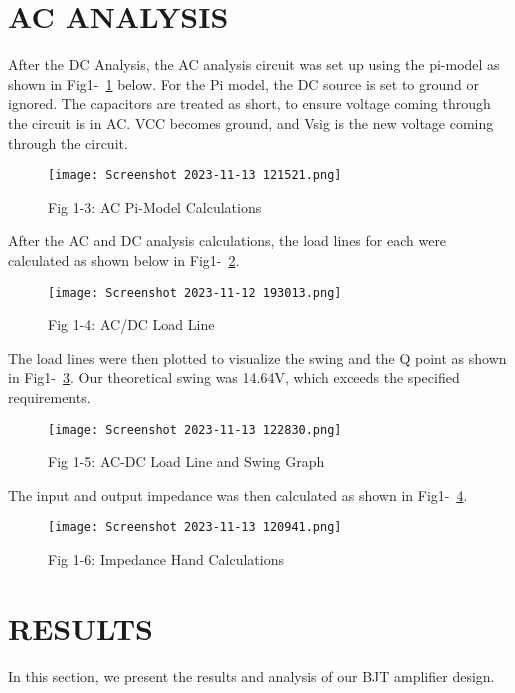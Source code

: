 \documentclass[conference]{IEEEtran}
\begin{document}
\section{AC ANALYSIS}

After the DC Analysis, the AC analysis circuit was set up using the pi-model as shown in Fig1-~\ref{fig1-:pi-model} below. For the Pi model, the DC source is set to ground or ignored. The capacitors are treated as short, to ensure voltage coming through the circuit is in AC. VCC becomes ground, and Vsig is the new voltage coming through the circuit.

\begin{figure}[h]
    \centering
    \texttt{[image: Screenshot 2023-11-13 121521.png]}
    \caption{Fig 1-3: AC Pi-Model Calculations}
    \label{fig1-:pi-model}
\end{figure}

After the AC and DC analysis calculations, the load lines for each were calculated as shown below in Fig1-~\ref{fig1-4:ac-dc-load-line}.

\begin{figure}[htbp]
    \centering
    \texttt{[image: Screenshot 2023-11-12 193013.png]}
    \caption{Fig 1-4: AC/DC Load Line}
    \label{fig1-4:ac-dc-load-line}
\end{figure}

The load lines were then plotted to visualize the swing and the Q point as shown in Fig1-~\ref{fig1-5:load-line-swing}. Our theoretical swing was 14.64V, which exceeds the specified requirements.

\begin{figure}[htbp]
    \centering
    \texttt{[image: Screenshot 2023-11-13 122830.png]}
    \caption{Fig 1-5: AC-DC Load Line and Swing Graph}
    \label{fig1-5:load-line-swing}
\end{figure}

The input and output impedance was then calculated as shown in Fig1-~\ref{fig1-6:impedance-calculation}.

\begin{figure}[htbp]
    \centering
    \texttt{[image: Screenshot 2023-11-13 120941.png]}
    \caption{Fig 1-6: Impedance Hand Calculations}
    \label{fig1-6:impedance-calculation}
\end{figure}



\section{RESULTS}
In this section, we present the results and analysis of our BJT amplifier design.
\end{document}
